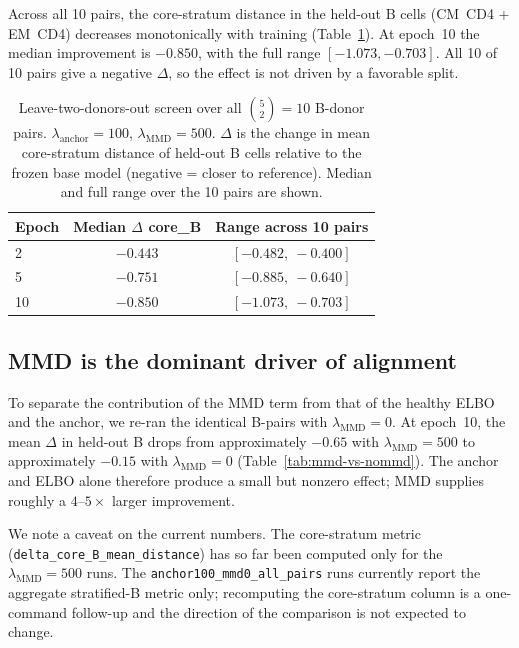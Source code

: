 \documentclass[12pt, a4paper]{article}
\begin{document}
Across all 10 pairs, the core-stratum distance in the held-out B cells
(CM~CD4 + EM~CD4) decreases monotonically with training
(Table~\ref{tab:main-10pairs}). At epoch~10 the median improvement is
\(-0.850\), with the full range \([-1.073, -0.703]\). All 10 of 10 pairs
give a negative \(\Delta\), so the effect is not driven by a favorable
split.

\begin{table}[H]
\centering
\caption{Leave-two-donors-out screen over all \(\binom{5}{2}=10\) B-donor
pairs. \(\lambda_{\text{anchor}}=100\), \(\lambda_{\text{MMD}}=500\).
\(\Delta\) is the change in mean core-stratum distance of held-out B cells
relative to the frozen base model (negative = closer to reference).
Median and full range over the 10 pairs are shown.}
\label{tab:main-10pairs}
\begin{tabular}{lcc}
\toprule
Epoch & Median \(\Delta\) core\_B & Range across 10 pairs \\
\midrule
2  & \(-0.443\) & \([-0.482,\ -0.400]\) \\
5  & \(-0.751\) & \([-0.885,\ -0.640]\) \\
10 & \(\mathbf{-0.850}\) & \([-1.073,\ -0.703]\) \\
\bottomrule
\end{tabular}
\end{table}


\subsection{MMD is the dominant driver of alignment}

To separate the contribution of the MMD term from that of the healthy
ELBO and the anchor, we re-ran the identical B-pairs with
\(\lambda_{\text{MMD}}=0\). At epoch~10, the mean \(\Delta\) in held-out
B drops from approximately \(-0.65\) with
\(\lambda_{\text{MMD}}=500\) to approximately \(-0.15\) with
\(\lambda_{\text{MMD}}=0\) (Table~\ref{tab:mmd-vs-nommd}). The anchor and
ELBO alone therefore produce a small but nonzero effect; MMD supplies
roughly a \(4\)--\(5\times\) larger improvement.

We note a caveat on the current numbers. The core-stratum metric
(\texttt{delta\_core\_B\_mean\_distance}) has so far been computed only
for the \(\lambda_{\text{MMD}}=500\) runs. The
\texttt{anchor100\_mmd0\_all\_pairs} runs currently report the aggregate
stratified-B metric only; recomputing the core-stratum column is a
one-command follow-up and the direction of the comparison is not expected
to change.
\end{document}

